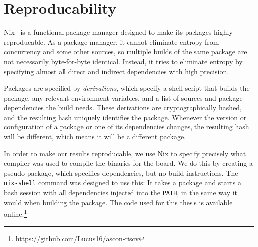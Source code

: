 \section{Reproducability}

Nix~\cite{nix} is a functional package manager designed to make its packages
highly reproducable. As a package manager, it cannot eliminate entropy from
concurrency and some other sources, so multiple builds of the same package are
not necessarily byte-for-byte identical. Instead, it tries to eliminate entropy
by specifying almost all direct and indirect dependencies with high precision.

Packages are specified by \emph{derivations}, which specify a shell script that
builds the package, any relevant environment variables, and a list of sources
and package dependencies the build needs. These derivations are
cryptographically hashed, and the resulting hash uniquely identifies the
package. Whenever the version or configuration of a package or one of its
dependencies changes, the resulting hash will be different, which means it will
be a different package.

In order to make our results reproducable, we use Nix to specify precisely what
compiler was used to compile the binaries for the board. We do this by creating
a pseudo-package, which specifies dependencies, but no build instructions. The
\texttt{nix-shell} command was designed to use this: It takes a package and
starts a bash session with all dependencies injected into the \texttt{PATH}, in
the same way it would when building the package. The code used for this thesis
is available online.\footnote{\url{https://github.com/Lucus16/ascon-riscv}}
